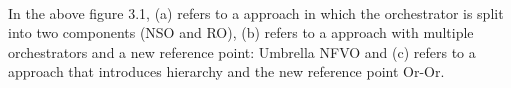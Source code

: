 \paragraph{}In the above figure 3.1, (a) refers to a approach in which the orchestrator is split into two components (NSO and RO), (b) refers to a approach with multiple orchestrators and a new reference point: Umbrella NFVO and (c) refers to a approach that introduces hierarchy and the new reference point Or-Or.
